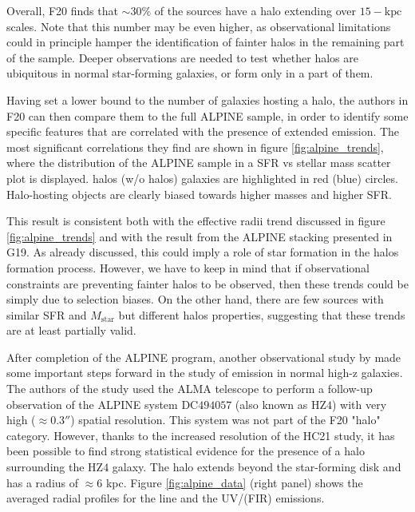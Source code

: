 Overall, F20 finds that $\sim 30\%$ of the sources have a \CII halo extending over $15-\mathrm{kpc}$ scales. Note that this number may be even higher, as observational limitations could in principle hamper the identification of fainter halos in the remaining part of the sample. Deeper observations are needed to test whether \CII halos are ubiquitous in normal star-forming galaxies, or form only in a part of them.

Having set a lower bound to the number of galaxies hosting a \CII halo, the authors in F20 can then compare them to the full ALPINE sample, in order to identify some specific features that are correlated with the presence of extended \CII emission. The most significant correlations they find are shown in figure \ref{fig:alpine_trends}, where the distribution of the ALPINE sample in a SFR vs stellar mass scatter plot is displayed. \CII halos (w/o \CII halos) galaxies are highlighted in red (blue) circles. Halo-hosting objects are clearly biased towards higher masses and higher SFR. 

This result is consistent both with the effective radii trend discussed in figure \ref{fig:alpine_trends} and with the result from the ALPINE stacking presented in G19. As already discussed, this could imply a role of star formation in the halos formation process. However, we have to keep in mind that if observational constraints are preventing fainter halos to be observed, then these trends could be simply due to selection biases. On the other hand, there are few sources with similar SFR and $M_\mathrm{star}$ but different halos properties, suggesting that these trends are at least partially valid. 

After completion of the ALPINE program, another observational study by \citet[][hereafter, HC21]{herrera2021kiloparsec} made some important steps forward in the study of \CII emission in normal high-z galaxies. The authors of the study used the ALMA telescope to perform a follow-up observation of the ALPINE system DC$494057$ (also known as HZ$4$) with very high ($\approx 0.3''$) spatial resolution. This system was not part of the F20 "\CII halo" category. However, thanks to the increased resolution of the HC21 study, it has been possible to find strong statistical evidence for the presence of a \CII halo surrounding the HZ$4$ galaxy. The halo extends beyond the star-forming disk and has a radius of $\approx 6$ kpc. Figure \ref{fig:alpine_data} (right panel) shows the averaged radial profiles for the \CII line and the UV/(FIR) emissions. 


